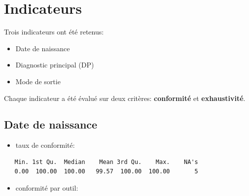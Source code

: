 \documentclass[]{article}
\providecommand{\tightlist}{%
  \setlength{\itemsep}{0pt}\setlength{\parskip}{0pt}}
\begin{document}
\section{Indicateurs}\label{indicateurs}

Trois indicateurs ont été retenus:

\begin{itemize}
\tightlist
\item
  Date de naissance
\item
  Diagnostic principal (DP)
\item
  Mode de sortie
\end{itemize}

Chaque indicateur a été évalué sur deux critères: \textbf{conformité} et
\textbf{exhaustivité}.

\subsection{Date de naissance}\label{date-de-naissance}

\begin{itemize}
\tightlist
\item
  taux de conformité:
\end{itemize}

\begin{verbatim}
   Min. 1st Qu.  Median    Mean 3rd Qu.    Max.    NA's 
   0.00  100.00  100.00   99.57  100.00  100.00       5 
\end{verbatim}

\begin{itemize}
\tightlist
\item
  conformité par outil:
\end{itemize}
\end{document}
